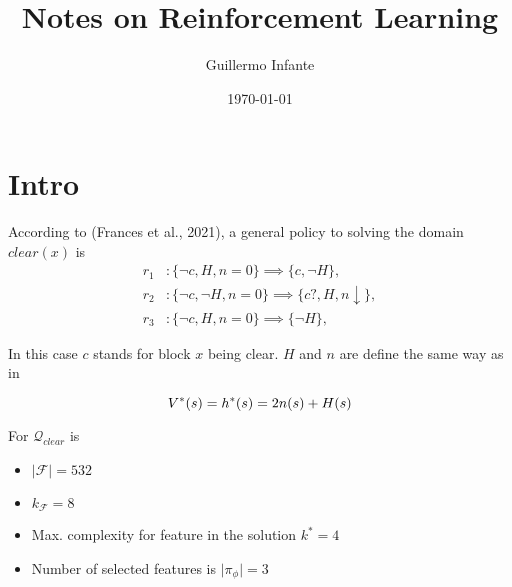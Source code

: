 \documentclass{article}
\title{Notes on Reinforcement Learning}
\author{Guillermo Infante}
\date{\today}
\begin{document}
\maketitle
\section{Intro}
According to (Frances et al., 2021), a general policy to solving the domain $clear(x)$ is
\begin{align}
    r_1 &: \{\neg c, H, n=0\} \implies \{c, \neg H\}, \\
    r_2 &: \{\neg c, \neg H, n=0 \} \implies \{c?, H, n \downarrow\}, \\
    r_3 &: \{\neg c, H, n=0\} \implies \{ \neg H \},
\end{align}

\noindent In this case $c$ stands for block $x$ being clear. $H$ and $n$ are define the same way as in 

\[
    V^*(s) = h^*(s) = 2 n(s) + H(s) \\   
\]

\noindent For $\mathcal{Q}_{clear}$ is
\begin{itemize}
    \item $\lvert \mathcal F \rvert = 532$
    \item $ k_\mathcal{F} = 8$
    \item Max. complexity for feature in the solution $ k^*= 4$
    \item Number of selected features is $\lvert \pi_\phi \rvert = 3$
\end{itemize} 
\end{document}
